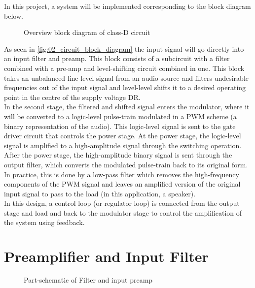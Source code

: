 In this project, a system will be implemented corresponding to the block diagram below.
\begin{figure}[htbp]
	\centering
	
	\caption{Overview block diagram of class-D circuit}
	\label{fig:02_circuit_block_diagram}
\end{figure}
As seen in \autoref{fig:02_circuit_block_diagram} the input signal will go directly into an input filter and preamp. This block consists of a subcircuit with a filter combined with a pre-amp and level-shifting circuit combined in one. This block takes an unbalanced line-level signal from an audio source and filters undesirable frequencies out of the input signal and level-level shifts it to a desired operating point in the centre of the supply voltage DR. \\
In the second stage, the filtered and shifted signal enters the modulator, where it will be converted to a logic-level pulse-train modulated in a PWM scheme (a binary representation of the audio). This logic-level signal is sent to the gate driver circuit that controls the power stage. At the power stage, the logic-level signal is amplified to a high-amplitude signal through the switching operation.\\
After the power stage, the high-amplitude binary signal is sent through the output filter, which converts the modulated pulse-train back to its original form. In practice, this is done by a low-pass filter which removes the high-frequency components of the PWM signal and leaves an amplified version of the original input signal to pass to the load (in this application, a speaker). \\
In this design, a control loop (or regulator loop) is connected from the output stage and load and back to the modulator stage to control the amplification of the system using feedback.

\section{Preamplifier and Input Filter} \label{sec:theory_filter_preamp}

\begin{figure}[htbp]
	\centering
	\begin{circuitikz}
		
	\end{circuitikz}
	\caption{Part-schematic of Filter and input preamp}
	\label{fig:02_part_filter_preamp}
\end{figure}

